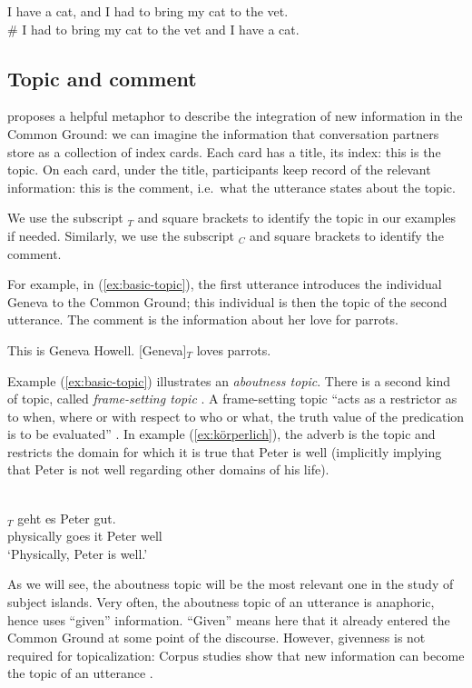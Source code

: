 \eal 
\label{ex:kuno-presupposition}
\ex I have a cat, and I had to bring my cat to the vet.
\label{ex:kuno-presupposition-cat-vet}
\ex  \citep[16]{Krifka.2007}\\
\# I had to bring my cat to the vet and I have a cat.
\label{ex:kuno-presupposition-vet-cat}
\zl 

\subsection{Topic and comment}

\citet{Reinhart.1982} proposes a helpful metaphor to describe the integration of new information in the Common Ground: we can imagine the information that conversation partners store as a collection of index cards. Each card has a title, its index: this is the topic. On each card, under the title, participants keep record of the relevant information: this is the comment, i.e.\ what the utterance states about the topic.

We use the subscript $_T$ and square brackets to identify the topic in our examples if needed. Similarly, we use the subscript $_C$ and square brackets to identify the comment. 

For example, in (\ref{ex:basic-topic}), the first utterance introduces the individual Geneva to the Common Ground; this individual is then the topic of the second utterance. The comment is the information about her love for parrots.

\ea This is Geneva Howell. [Geneva]$_T$ loves parrots.
\label{ex:basic-topic}
\z 

Example (\ref{ex:basic-topic}) illustrates an \emph{aboutness topic}. There is a second kind of topic, called \emph{frame-setting topic} \citep[45--46]{Krifka.2007}. A frame-setting topic ``acts as a restrictor as to when, where or with respect to who or what, the truth value of the predication is to be evaluated'' \citep[130]{Erteschik-Shir.1997}. In example (\ref{ex:körperlich}), the adverb is the topic and restricts the domain for which it is true that Peter is well (implicitly implying that Peter is not well regarding other domains of his life).

\ea \citep[655]{Jacobs.2001}\\
\gll [Körperlich]$_T$ geht es Peter gut.\\
physically goes it Peter well\\
\glt `Physically, Peter is well.'
\label{ex:körperlich}
\z 

As we will see, the aboutness topic will be the most relevant one in the study of subject islands. Very often, the aboutness topic of an utterance is anaphoric, hence uses ``given'' information. ``Given'' means here that it already entered the Common Ground at some point of the discourse. However, givenness is not required for topicalization: Corpus studies show that new information can become the topic of an utterance \citep[41--42]{Krifka.2007}.  

